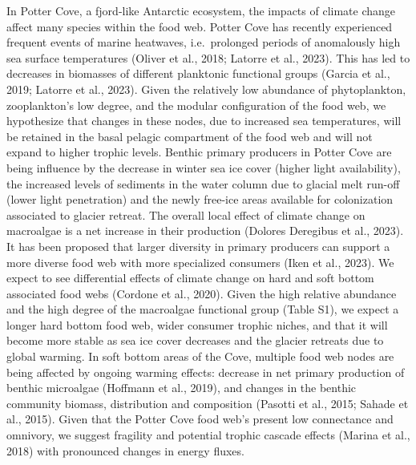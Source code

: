 \documentclass[
]{article}
\begin{document}
In Potter Cove, a fjord-like Antarctic ecosystem, the impacts of climate
change affect many species within the food web. Potter Cove has recently
experienced frequent events of marine heatwaves, i.e.~prolonged periods
of anomalously high sea surface temperatures (Oliver et al., 2018;
Latorre et al., 2023). This has led to decreases in biomasses of
different planktonic functional groups (Garcia et al., 2019; Latorre et
al., 2023). Given the relatively low abundance of phytoplankton,
zooplankton's low degree, and the modular configuration of the food web,
we hypothesize that changes in these nodes, due to increased sea
temperatures, will be retained in the basal pelagic compartment of the
food web and will not expand to higher trophic levels. Benthic primary
producers in Potter Cove are being influence by the decrease in winter
sea ice cover (higher light availability), the increased levels of
sediments in the water column due to glacial melt run-off (lower light
penetration) and the newly free-ice areas available for colonization
associated to glacier retreat. The overall local effect of climate
change on macroalgae is a net increase in their production (Dolores
Deregibus et al., 2023). It has been proposed that larger diversity in
primary producers can support a more diverse food web with more
specialized consumers (Iken et al., 2023). We expect to see differential
effects of climate change on hard and soft bottom associated food webs
(Cordone et al., 2020). Given the high relative abundance and the high
degree of the macroalgae functional group (Table S1), we expect a longer
hard bottom food web, wider consumer trophic niches, and that it will
become more stable as sea ice cover decreases and the glacier retreats
due to global warming. In soft bottom areas of the Cove, multiple food
web nodes are being affected by ongoing warming effects: decrease in net
primary production of benthic microalgae (Hoffmann et al., 2019), and
changes in the benthic community biomass, distribution and composition
(Pasotti et al., 2015; Sahade et al., 2015). Given that the Potter Cove
food web's present low connectance and omnivory, we suggest fragility
and potential trophic cascade effects (Marina et al., 2018) with
pronounced changes in energy fluxes.
\end{document}
